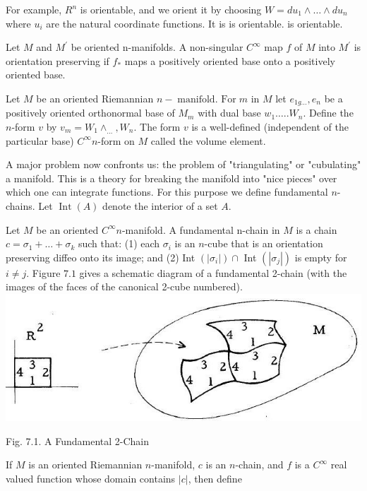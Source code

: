 \documentclass[10pt]{article}
\begin{document}
For example, $R^{n}$ is orientable, and we orient it by choosing $W=d u_{1} \wedge \ldots \wedge d u_{n}$ where $u_{i}$ are the natural coordinate functions. It is is orientable. is orientable.

Let $M$ and $M^{\prime}$ be oriented n-manifolds. A non-singular $C^{\infty}$ map $f$ of $M$ into $M^{\prime}$ is orientation preserving if $f_{*}$ maps a positively oriented base onto a positively oriented base.

Let $M$ be an oriented Riemannian $n-\operatorname{manifold.~For} m$ in $M$ let $e_{1 g . . .}, e_{n}$ be a positively oriented orthonormal base of $M_{m}$ with dual base $w_{1} \ldots . . W_{n}$. Define the $n$-form $v$ by $v_{m}=W_{1} \wedge_{\ldots}, W_{n}$. The form $v$ is a well-defined (independent of the particular base) $C^{\infty} n$-form on $M$ called the volume element.

A major problem now confronts us: the problem of "triangulating" or "cubulating" a manifold. This is a theory for breaking the manifold into "nice pieces" over which one can integrate functions. For this purpose we define fundamental $n$-chains. Let $\operatorname{Int}(A)$ denote the interior of a set $A$.

Let $M$ be an oriented $C^{\infty} n$-manifold. A fundamental n-chain in $M$ is a chain $c=\sigma_{1}+\ldots+\sigma_{k}$ such that: (1) each $\sigma_{i}$ is an $n$-cube that is an orientation preserving diffeo onto its image; and (2) Int $\left(\left|\sigma_{i}\right|\right) \cap$ Int $\left(\left|\sigma_{j}\right|\right)$ is empty for $i \neq j .$ Figure $7.1$ gives a schematic diagram of a fundamental 2-chain (with the images of the faces of the canonical 2-cube numbered).\\

\includegraphics[max width=\textwidth]{2022_07_16_f4e476ee2159dc67e746g-55}

Fig. 7.1. A Fundamental 2-Chain

If $M$ is an oriented Riemannian $n$-manifold, $c$ is an $n$-chain, and $f$ is a $C^{\infty}$ real valued function whose domain contains $|c|$, then define
\end{document}
